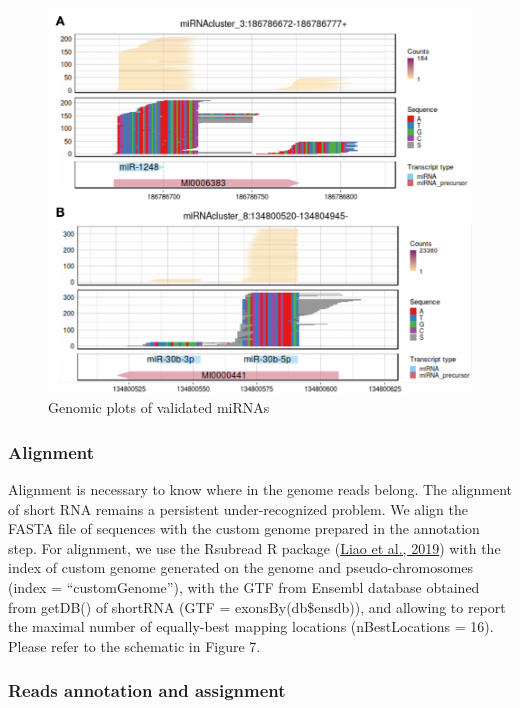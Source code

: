 \documentclass[12pt,twoside]{reedthesis}
\begin{document}
\begin{subfigures}
\begin{figure}[h]
{\centering \includegraphics{thesis_files/figure-latex/3f18b-1} 

}

\caption{Genomic plots of validated miRNAs}\label{fig:3f18b}
\end{figure}
\end{subfigures}
\hypertarget{alignment}{%
\subsubsection{Alignment}\label{alignment}}

Alignment is necessary to know where in the genome reads belong. The
alignment of short RNA remains a persistent under-recognized problem. We
align the FASTA file of sequences with the custom genome prepared in the
annotation step. For alignment, we use the Rsubread R package
(\protect\hyperlink{ref-liao2019}{Liao et al., 2019}) with the index of custom genome generated on the genome and
pseudo-chromosomes (index = ``customGenome''), with the GTF from Ensembl
database obtained from getDB() of shortRNA (GTF = exonsBy(db\$ensdb)),
and allowing to report the maximal number of equally-best mapping
locations (nBestLocations = 16). Please refer to the schematic in Figure
7.

\hypertarget{reads-annotation-and-assignment}{%
\subsubsection{Reads annotation and assignment}\label{reads-annotation-and-assignment}}
\end{document}
